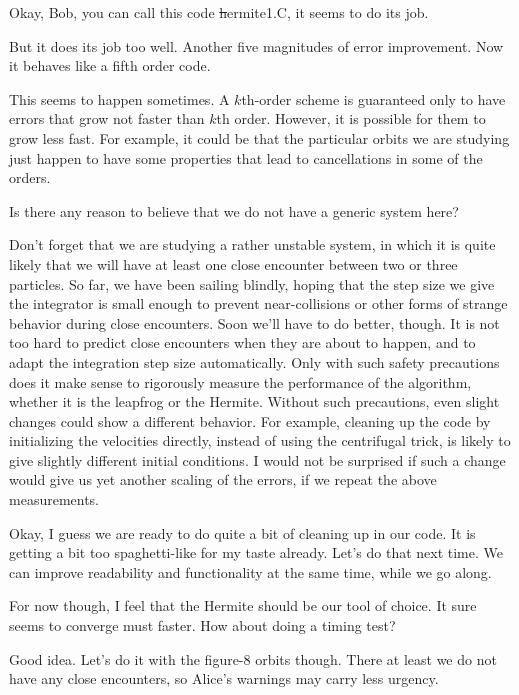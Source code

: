 \abc

\carol
Okay, Bob, you can call this code {\st hermite1.C}, it seems to do its job.

\bob
But it does its job too well.  Another five magnitudes of error improvement.
Now it behaves like a fifth order code.

\alice
This seems to happen sometimes.  A $k$th-order scheme is guaranteed
only to have errors that grow not faster than $k$th order.  However,
it is possible for them to grow less fast.  For example, it could be
that the particular orbits we are studying just happen to have some
properties that lead to cancellations in some of the orders.

\carol
Is there any reason to believe that we do not have a generic system here?

\alice
Don't forget that we are studying a rather unstable system, in which
it is quite likely that we will have at least one close encounter
between two or three particles.  So far, we have been sailing blindly,
hoping that the step size we give the integrator is small enough to
prevent near-collisions or other forms of strange behavior during
close encounters.  Soon we'll have to do better, though.  It is not
too hard to predict close encounters when they are about to happen,
and to adapt the integration step size automatically.  Only with such
safety precautions does it make sense to rigorously measure the
performance of the algorithm, whether it is the leapfrog or the
Hermite.  Without such precautions, even slight changes could show a
different behavior.  For example, cleaning up the code by initializing
the velocities directly, instead of using the centrifugal trick, is
likely to give slightly different initial conditions.  I would not
be surprised if such a change would give us yet another scaling of the
errors, if we repeat the above measurements.

\bob
Okay, I guess we are ready to do quite a bit of cleaning up in our code.
It is getting a bit too spaghetti-like for my taste already.  Let's do
that next time.  We can improve readability and functionality at the
same time, while we go along.

\carol
For now though, I feel that the Hermite should be our tool of choice.
It sure seems to converge must faster.  How about doing a timing test?

\bob
Good idea.  Let's do it with the figure-8 orbits though.  There at
least we do not have any close encounters, so Alice's warnings may
carry less urgency.

